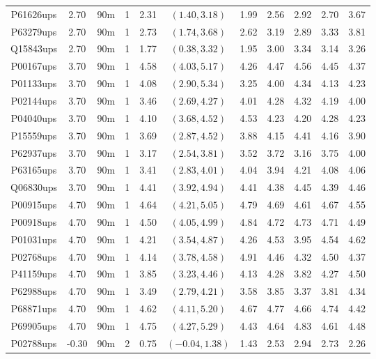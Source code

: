 \begin{landscape}
\begin{longtable}{cccc|cc|ccccc}
  P61626ups & 2.70 & 90m &   1 & 2.31 & $(1.40, 3.18)$ & 1.99 & 2.56 & 2.92 & 2.70 & 3.67 \\ 
  P63279ups & 2.70 & 90m &   1 & 2.73 & $(1.74, 3.68)$ & 2.62 & 3.19 & 2.89 & 3.33 & 3.81 \\ 
  Q15843ups & 2.70 & 90m &   1 & 1.77 & $(0.38, 3.32)$ & 1.95 & 3.00 & 3.34 & 3.14 & 3.26 \\ 
  P00167ups & 3.70 & 90m &   1 & 4.58 & $(4.03, 5.17)$ & 4.26 & 4.47 & 4.56 & 4.45 & 4.37 \\ 
  P01133ups & 3.70 & 90m &   1 & 4.08 & $(2.90, 5.34)$ & 3.25 & 4.00 & 4.34 & 4.13 & 4.23 \\ 
  P02144ups & 3.70 & 90m &   1 & 3.46 & $(2.69, 4.27)$ & 4.01 & 4.28 & 4.32 & 4.19 & 4.00 \\ 
  P04040ups & 3.70 & 90m &   1 & 4.10 & $(3.68, 4.52)$ & 4.53 & 4.23 & 4.20 & 4.28 & 4.23 \\ 
  P15559ups & 3.70 & 90m &   1 & 3.69 & $(2.87, 4.52)$ & 3.88 & 4.15 & 4.41 & 4.16 & 3.90 \\ 
  P62937ups & 3.70 & 90m &   1 & 3.17 & $(2.54, 3.81)$ & 3.52 & 3.72 & 3.16 & 3.75 & 4.00 \\ 
  P63165ups & 3.70 & 90m &   1 & 3.41 & $(2.83, 4.01)$ & 4.04 & 3.94 & 4.21 & 4.08 & 4.06 \\ 
  Q06830ups & 3.70 & 90m &   1 & 4.41 & $(3.92, 4.94)$ & 4.41 & 4.38 & 4.45 & 4.39 & 4.46 \\ 
  P00915ups & 4.70 & 90m &   1 & 4.64 & $(4.21, 5.05)$ & 4.79 & 4.69 & 4.61 & 4.67 & 4.55 \\ 
  P00918ups & 4.70 & 90m &   1 & 4.50 & $(4.05, 4.99)$ & 4.84 & 4.72 & 4.73 & 4.71 & 4.49 \\ 
  P01031ups & 4.70 & 90m &   1 & 4.21 & $(3.54, 4.87)$ & 4.26 & 4.53 & 3.95 & 4.54 & 4.62 \\ 
  P02768ups & 4.70 & 90m &   1 & 4.14 & $(3.78, 4.58)$ & 4.91 & 4.46 & 4.32 & 4.50 & 4.37 \\ 
  P41159ups & 4.70 & 90m &   1 & 3.85 & $(3.23, 4.46)$ & 4.13 & 4.28 & 3.82 & 4.27 & 4.50 \\ 
  P62988ups & 4.70 & 90m &   1 & 3.49 & $(2.79, 4.21)$ & 3.58 & 3.85 & 3.37 & 3.81 & 4.34 \\ 
  P68871ups & 4.70 & 90m &   1 & 4.62 & $(4.11, 5.20)$ & 4.67 & 4.77 & 4.66 & 4.74 & 4.42 \\ 
  P69905ups & 4.70 & 90m &   1 & 4.75 & $(4.27, 5.29)$ & 4.43 & 4.64 & 4.83 & 4.61 & 4.48 \\ 
  P02788ups & -0.30 & 90m &   2 & 0.75 & $(-0.04, 1.38)$ & 1.43 & 2.53 & 2.94 & 2.73 & 2.26 \\ 

\end{longtable}
\end{landscape}
